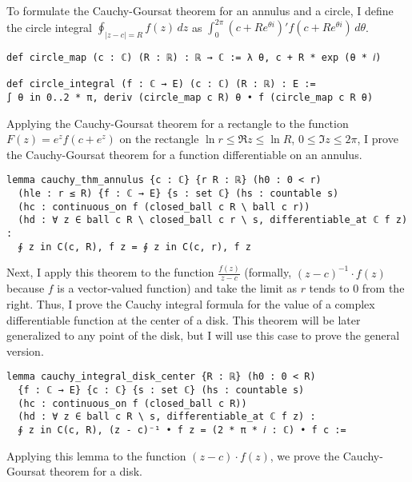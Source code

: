 \documentclass[a4paper, UKenglish,cleveref, autoref, thm-restate]{lipics-v2021}
\begin{document}
To formulate the Cauchy-Goursat theorem for an annulus and a circle, I
define the circle integral \(\oint_{|z-c|=R}f(z)\,dz\) as
\(\int_{0}^{2\pi}(c+Re^{\theta i})'f(c+Re^{\theta i})\,d\theta\).

\begin{lstlisting}[caption=Definition of the circle integral \(\oint_{|z-c|=R}f(z)\,dz\)]
def circle_map (c : ℂ) (R : ℝ) : ℝ → ℂ := λ θ, c + R * exp (θ * 𝑖)

def circle_integral (f : ℂ → E) (c : ℂ) (R : ℝ) : E :=
∫ θ in 0..2 * π, deriv (circle_map c R) θ • f (circle_map c R θ)
\end{lstlisting}

Applying the Cauchy-Goursat theorem for a rectangle to the function
\(F(z)=e^{z}f(c+e^{z})\) on the rectangle \(\ln r\le \Re z\le \ln R\),
\(0\le \Im z\le 2\pi\), I prove the Cauchy-Goursat theorem for a
function differentiable on an annulus.

\begin{lstlisting}[caption=The Cauchy-Goursat theorem for an annulus,label=lst:cauchy-annulus]
lemma cauchy_thm_annulus {c : ℂ} {r R : ℝ} (h0 : 0 < r)
  (hle : r ≤ R) {f : ℂ → E} {s : set ℂ} (hs : countable s)
  (hc : continuous_on f (closed_ball c R \ ball c r))
  (hd : ∀ z ∈ ball c R \ closed_ball c r \ s, differentiable_at ℂ f z) :
  ∮ z in C(c, R), f z = ∮ z in C(c, r), f z
\end{lstlisting}

Next, I apply this theorem to the function \(\frac{f(z)}{z-c}\)
(formally, \((z-c)^{-1}\cdot f(z)\) because \(f\) is a vector-valued
function) and take the limit as \(r\) tends to \(0\) from the
right. Thus, I prove the Cauchy integral formula for the value of a
complex differentiable function at the center of a disk. This theorem
will be later generalized to any point of the disk, but I will use
this case to prove the general version.

\begin{lstlisting}[caption=Cauchy integral formula for the center of a disk,label=lst:cauchy-int-center]
lemma cauchy_integral_disk_center {R : ℝ} (h0 : 0 < R)
  {f : ℂ → E} {c : ℂ} {s : set ℂ} (hs : countable s)
  (hc : continuous_on f (closed_ball c R))
  (hd : ∀ z ∈ ball c R \ s, differentiable_at ℂ f z) :
  ∮ z in C(c, R), (z - c)⁻¹ • f z = (2 * π * 𝑖 : ℂ) • f c :=
\end{lstlisting}

Applying this lemma to the function \((z-c)\cdot f(z)\), we prove the
Cauchy-Goursat theorem for a disk.
\end{document}
